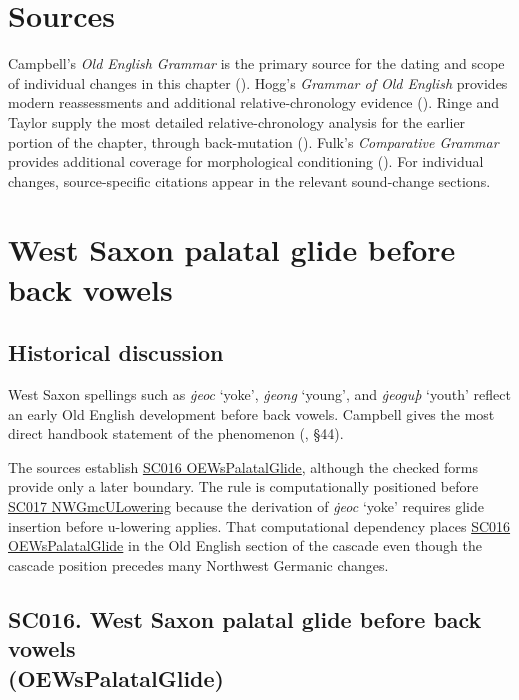 \documentclass[
  british,
  a4paper,
  openany]{book}
\providecommand{\texorpdfstring}[2]{#1}
\DeclareRobustCommand{\CAPRRuleHeading}[2]{%
  #1\texorpdfstring{\\(#2)}{ (#2)}%
}
\begin{document}
\section{Sources}\label{sources}

Campbell's \emph{Old English Grammar} is the primary source for the
dating and scope of individual changes in this chapter
(). Hogg's \emph{Grammar of
Old English} provides modern reassessments and additional
relative-chronology evidence (). Ringe
and Taylor supply the most detailed relative-chronology analysis for the
earlier portion of the chapter, through back-mutation
(). Fulk's
\emph{Comparative Grammar} provides additional coverage for
morphological conditioning (). For
individual changes, source-specific citations appear in the relevant
sound-change sections.

\section{West Saxon palatal glide before back
vowels}\label{west-saxon-palatal-glide-before-back-vowels}

\subsection{Historical discussion}\label{historical-discussion-26}

West Saxon spellings such as \emph{ġeoc} `yoke', \emph{ġeong} `young',
and \emph{ġeoguþ} `youth' reflect an early Old English development
before back vowels. Campbell gives the most direct handbook statement of
the phenomenon (, §44).

The sources establish \hyperref[rule-OEWsPalatalGlide]{SC016
OEWsPalatalGlide}, although the checked forms provide only a later
boundary. The rule is computationally positioned before
\hyperref[rule-NWGmcULowering]{SC017 NWGmcULowering} because the
derivation of \emph{ġeoc} `yoke' requires glide insertion before
u-lowering applies. That computational dependency places
\hyperref[rule-OEWsPalatalGlide]{SC016 OEWsPalatalGlide} in the Old
English section of the cascade even though the cascade position precedes
many Northwest Germanic changes.

\subsection{\texorpdfstring{\CAPRRuleHeading{SC016. West Saxon palatal glide before back vowels}{OEWsPalatalGlide}}{}}\label{rule-OEWsPalatalGlide}
\end{document}

